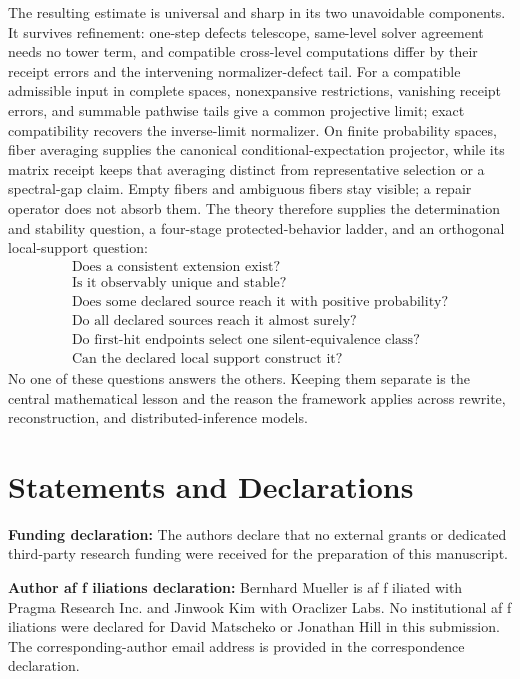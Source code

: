 \documentclass[11pt]{article}
\theoremstyle{definition}
\theoremstyle{remark}
\numberwithin{equation}{section}
\begin{document}
The resulting estimate is universal and sharp in its two unavoidable components. It survives refinement: one-step defects telescope, same-level solver agreement needs no tower term, and compatible cross-level computations differ by their receipt errors and the intervening normalizer-defect tail.  For a compatible admissible input in complete spaces, nonexpansive restrictions, vanishing receipt errors, and summable pathwise tails give a common projective limit; exact compatibility recovers the inverse-limit normalizer.  On finite probability spaces, fiber averaging supplies the canonical conditional-expectation projector, while its matrix receipt keeps that averaging distinct from representative selection or a spectral-gap claim.  Empty fibers and ambiguous fibers stay visible; a repair operator does not absorb them.  The theory therefore supplies the determination and stability question, a four-stage protected-behavior ladder, and an orthogonal local-support question:
\[
\boxed{
\begin{array}{c}
\text{Does a consistent extension exist?}\\
\text{Is it observably unique and stable?}\\
\text{Does some declared source reach it with positive probability?}\\
\text{Do all declared sources reach it almost surely?}\\
\text{Do first-hit endpoints select one silent-equivalence class?}\\
\text{Can the declared local support construct it?}
\end{array}}
\]
No one of these questions answers the others.  Keeping them separate is the central mathematical lesson and the reason the framework applies across rewrite, reconstruction, and distributed-inference models.

\section*{Statements and Declarations}

\noindent\textbf{Funding declaration:} The authors declare that no external grants or dedicated
third-party research funding were received for the preparation of this manuscript.

\noindent\textbf{Author af\kern0pt f\kern0pt iliations declaration:} Bernhard Mueller is af\kern0pt f\kern0pt iliated with
Pragma Research Inc. and Jinwook Kim with Oraclizer Labs. No institutional
af\kern0pt f\kern0pt iliations were declared for David Matscheko or
Jonathan Hill in this submission. The corresponding-author email address is provided in the
correspondence declaration.
\end{document}
